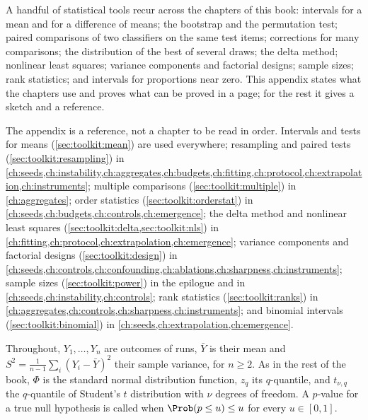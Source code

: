 \begin{refsection}

\begin{chaptersummary}
A handful of statistical tools recur across the chapters of this book: intervals for a mean and for a difference of means; the bootstrap and the permutation test; paired comparisons of two classifiers on the same test items; corrections for many comparisons; the distribution of the best of several draws; the delta method; nonlinear least squares; variance components and factorial designs; sample sizes; rank statistics; and intervals for proportions near zero. This appendix states what the chapters use and proves what can be proved in a page; for the rest it gives a sketch and a reference.
\end{chaptersummary}

The appendix is a reference, not a chapter to be read in order. Intervals and tests for means (\cref{sec:toolkit:mean}) are used everywhere; resampling and paired tests (\cref{sec:toolkit:resampling}) in \cref{ch:seeds,ch:instability,ch:aggregates,ch:budgets,ch:fitting,ch:protocol,ch:extrapolation,ch:instruments}; multiple comparisons (\cref{sec:toolkit:multiple}) in \cref{ch:aggregates}; order statistics (\cref{sec:toolkit:orderstat}) in \cref{ch:seeds,ch:budgets,ch:controls,ch:emergence}; the delta method and nonlinear least squares (\cref{sec:toolkit:delta,sec:toolkit:nls}) in \cref{ch:fitting,ch:protocol,ch:extrapolation,ch:emergence}; variance components and factorial designs (\cref{sec:toolkit:design}) in \cref{ch:seeds,ch:controls,ch:confounding,ch:ablations,ch:sharpness,ch:instruments}; sample sizes (\cref{sec:toolkit:power}) in the epilogue and in \cref{ch:seeds,ch:instability,ch:controls}; rank statistics (\cref{sec:toolkit:ranks}) in \cref{ch:aggregates,ch:controls,ch:sharpness,ch:instruments}; and binomial intervals (\cref{sec:toolkit:binomial}) in \cref{ch:seeds,ch:extrapolation,ch:emergence}.

Throughout, $Y_1,\dots,Y_n$ are outcomes of runs, $\bar Y$ is their mean and $S^2=\frac1{n-1}\sum_i(Y_i-\bar Y)^2$ their sample variance, for $n\ge2$. As in the rest of the book, $\Phi$ is the standard normal distribution function, $z_q$ its $q$-quantile, and $t_{\nu,q}$ the $q$-quantile of Student's $t$ distribution with $\nu$ degrees of freedom. A $p$-value for a true null hypothesis is called  when $\Prob(p\le u)\le u$ for every $u\in[0,1]$.


\end{refsection}
